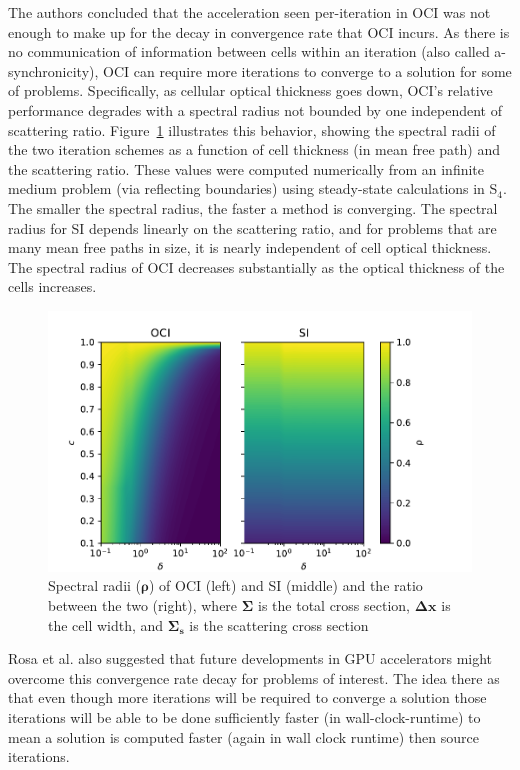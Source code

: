 The authors concluded that the acceleration seen per-iteration in OCI was not enough to make up for the decay in convergence rate that OCI incurs.
As there is no communication of information between cells within an iteration (also called a-synchronicity), OCI can require more iterations to converge to a solution for some of problems. 
Specifically, as cellular optical thickness goes down, OCI's relative performance degrades with a spectral radius not bounded by one independent of scattering ratio.
Figure~\ref{fig:specrad} illustrates this behavior, showing the spectral radii of the two iteration schemes as a function of cell thickness (in mean free path) and the scattering ratio.
These values were computed numerically from an infinite medium problem (via reflecting boundaries) using steady-state calculations in S$_4$. 
The smaller the spectral radius, the faster a method is converging.
The spectral radius for SI depends linearly on the scattering ratio, and for problems that are many mean free paths in size, it is nearly independent of cell optical thickness. 
The spectral radius of OCI decreases substantially as the optical thickness of the cells increases.
\begin{figure}[!htb]
    \centering
    \includegraphics[width=\textwidth]{figures/therefore_figs/ss_specrads.pdf}
    \caption{Spectral radii ($\boldsymbol{\rho}$) of OCI (left) and SI (middle) and the ratio between the two (right), where $\boldsymbol{\Sigma}$ is the total cross section, $\boldsymbol{\Delta x}$ is the cell width, and $\boldsymbol{\Sigma_s}$ is the scattering cross section}
    \label{fig:specrad}
  \end{figure}
Rosa et al. also suggested that future developments in GPU accelerators might overcome this convergence rate decay for problems of interest.
The idea there as that even though more iterations will be required to converge a solution those iterations will be able to be done sufficiently faster (in wall-clock-runtime) to mean a solution is computed faster (again in wall clock runtime) then source iterations.

